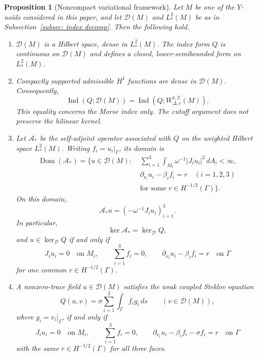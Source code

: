 \documentclass[10pt,a4paper]{amsart}
\newtheorem{prop}[thm]{Proposition}
\begin{document}
\begin{prop}[Noncompact variational framework]\label{prop: function space for noncompact index}
Let $M$ be one of the $Y$-noids considered in this paper, and let $\mathcal D(M)$ and $L_*^2(M)$ be as in Subsection~\ref{subsec: index decomp}. Then the following hold.
\begin{enumerate}
\item[(a)] $\mathcal D(M)$ is a Hilbert space, dense in $L_*^2(M)$. The index form $Q$ is continuous on $\mathcal D(M)$ and defines a closed, lower-semibounded form on $L_*^2(M)$.

\item[(b)] Compactly supported admissible $H^1$ functions are dense in $\mathcal D(M)$. Consequently,
\[
\operatorname{Ind}(Q;\mathcal D(M))
=
\operatorname{Ind}(Q;W_{\Delta,c}^{1,2}(M)).
\]
This equality concerns the Morse index only. The cutoff argument does not preserve the bilinear kernel.

\item[(c)] Let $\mathscr A_*$ be the self-adjoint operator associated with $Q$ on the weighted Hilbert space $L_*^2(M)$. Writing $f_i=u_i|_\Gamma$, its domain is
\[
\begin{split}
\operatorname{Dom}(\mathscr A_*)=\biggl\{u\in\mathcal D(M):\;&
\sum_{i=1}^3\int_{M_i}\omega^{-1}|J_i u_i|^2\,dA_i<\infty,\\
&\partial_{\nu_i}u_i-\beta_i f_i=r\quad(i=1,2,3)\\
&\text{for some }r\in H^{-1/2}(\Gamma)\biggr\}.
\end{split}
\]
On this domain,
\[
\mathscr A_*u=(-\omega^{-1}J_i u_i)_{i=1}^3.
\]
In particular,
\[
\ker\mathscr A_*=\ker_{\mathcal D}Q,
\]
and $u\in\ker_{\mathcal D}Q$ if and only if
\[
J_i u_i=0\quad\text{on }M_i,\qquad
\sum_{i=1}^3 f_i=0,\qquad
\partial_{\nu_i}u_i-\beta_i f_i=r\quad\text{on }\Gamma
\]
for one common $r\in H^{-1/2}(\Gamma)$.

\item[(d)] A nonzero-trace field $u\in\mathcal D(M)$ satisfies the weak coupled Steklov equation
\[
Q(u,v)=\sigma\sum_{i=1}^3\int_\Gamma f_i g_i\,ds
\qquad(v\in\mathcal D(M)),
\]
where $g_i=v_i|_\Gamma$, if and only if
\[
J_i u_i=0\quad\text{on }M_i,\qquad
\sum_{i=1}^3f_i=0,
\qquad
\partial_{\nu_i}u_i-\beta_i f_i-\sigma f_i=r\quad\text{on }\Gamma
\]
with the same $r\in H^{-1/2}(\Gamma)$ for all three faces.
\end{enumerate}
\end{prop}
\end{document}
